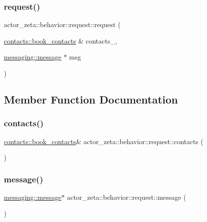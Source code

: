 \subsubsection{\texorpdfstring{request()}{request()}\hspace{0.1cm}{\footnotesize\ttfamily [4/4]}}
{\footnotesize\ttfamily actor\+\_\+zeta\+::behavior\+::request\+::request (\begin{DoxyParamCaption}\item[{\hyperlink{classactor__zeta_1_1contacts_1_1book__contacts}{contacts\+::book\+\_\+contacts} \&}]{contacts\+\_\+,  }\item[{\hyperlink{classactor__zeta_1_1messaging_1_1message}{messaging\+::message} $\ast$}]{msg }\end{DoxyParamCaption})\hspace{0.3cm}{\ttfamily [inline]}}



\subsection{Member Function Documentation}
\mbox{\label{classactor__zeta_1_1behavior_1_1request_ae94a34415643bf735bf6295857f470bf}} 
\subsubsection{\texorpdfstring{contacts()}{contacts()}}
{\footnotesize\ttfamily \hyperlink{classactor__zeta_1_1contacts_1_1book__contacts}{contacts\+::book\+\_\+contacts}\& actor\+\_\+zeta\+::behavior\+::request\+::contacts (\begin{DoxyParamCaption}{ }\end{DoxyParamCaption})\hspace{0.3cm}{\ttfamily [inline]}}

\mbox{\label{classactor__zeta_1_1behavior_1_1request_a3bd267cd2f121a5b57e616572ddbf762}} 
\subsubsection{\texorpdfstring{message()}{message()}}
{\footnotesize\ttfamily \hyperlink{classactor__zeta_1_1messaging_1_1message}{messaging\+::message}$\ast$ actor\+\_\+zeta\+::behavior\+::request\+::message (\begin{DoxyParamCaption}{ }\end{DoxyParamCaption})\hspace{0.3cm}{\ttfamily [inline]}}


